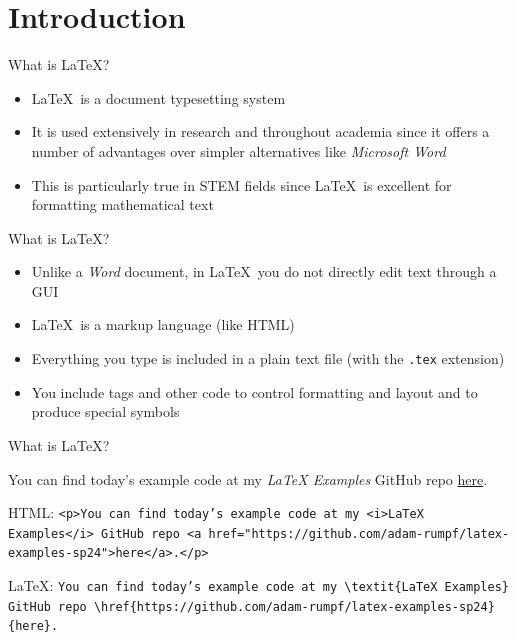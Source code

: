 \documentclass{beamer} %
\begin{document}
\section{Introduction}

\begin{frame}{What is \LaTeX?}

\begin{itemize}
	\item \LaTeX\ is a document typesetting system
	\item It is used extensively in research and throughout academia since it offers a number of advantages over simpler alternatives like \textit{Microsoft Word}
	\item This is particularly true in STEM fields since \LaTeX\ is excellent for formatting mathematical text
\end{itemize}

\end{frame}

\begin{frame}{What is \LaTeX?}

\begin{itemize}
	\item Unlike a \textit{Word} document, in \LaTeX\ you do not directly edit text through a GUI
	\item \LaTeX\ is a markup language (like HTML)
	\item Everything you type is included in a plain text file (with the \texttt{.tex} extension)
	\item You include tags and other code to control formatting and layout and to produce special symbols
\end{itemize}

\end{frame}

\begin{frame}{What is \LaTeX?}

You can find today's example code at my \textit{LaTeX Examples} GitHub repo \href{https://github.com/adam-rumpf/latex-examples-sp24}{here}.

\vfill

\scriptsize

HTML: \texttt{<p>You can find today's example code at my <i>LaTeX Examples</i> GitHub repo <a~href="https://github.com/adam-rumpf/latex-examples-sp24">here</a>.</p>}

\quad

\LaTeX: \texttt{You can find today's example code at my \textbackslash textit\{LaTeX Examples\} GitHub repo \textbackslash href\{https://github.com/adam-rumpf/latex-examples-sp24\}\{here\}.}

\end{frame}
\end{document}
